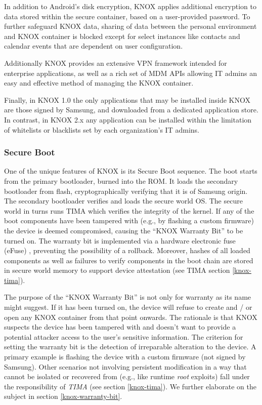 \documentclass[11pt]{article}
\begin{document}
In addition to Android's disk encryption, KNOX applies additional encryption to data stored within the secure container, based on a user-provided password.
To further safeguard KNOX data, sharing of data between the personal environment and KNOX container  
is blocked except for select instances like contacts and calendar events that are dependent on user configuration.

Additionally KNOX provides an extensive VPN framework intended for enterprise applications, as well as a rich set of MDM APIs allowing IT admins
an easy and effective method of managing the KNOX container.

Finally, in KNOX 1.0 the only applications that may be installed inside KNOX are those signed by Samsung, 
and downloaded from a dedicated application store. 
In contrast, in KNOX 2.x any application can be installed within the limitation of whitelists or blacklists set by each organization's IT admins. 

\subsubsection{Secure Boot} \label{knox-secure-boot}
One of the unique features of KNOX is its Secure Boot sequence.
The boot starts from the primary bootloader, burned into the ROM. It loads the secondary bootloader from flash, cryptographically verifying that it is of 
Samsung origin. The secondary bootloader verifies and loads the secure world OS. The secure world in turns runs TIMA which verifies the integrity of the 
kernel. If any of the boot components have been tampered with (e.g., by flashing a custom firmware) the device is deemed compromised, causing the 
``KNOX Warranty Bit'' \cite{KNOXWarrantyBit} to be turned on. The warranty bit is implemented via a hardware electronic fuse (eFuse) \cite{eFuse}, preventing the possibility of a rollback. 
Moreover, hashes of all loaded components as well as failures to verify components in the boot chain are stored in secure world memory to support device attestation (see TIMA section
\ref{knox-tima}).

The purpose of the ``KNOX Warranty Bit'' is not only for warranty as its name might suggest. 
If it has been turned on, the device will refuse to create and / or open any KNOX container from that point onwards. 
The rationale is that KNOX suspects the device has been tampered with and doesn't want to 
provide a potential attacker access to the user's sensitive information. 
The criterion for setting the warranty bit is the detection of irreparable alteration to the device. A primary example is flashing the device with a 
custom firmware (not signed by Samsung). Other scenarios not involving persistent modification in a way that cannot 
be isolated or recovered from (e.g., like runtime \emph{root} exploits) fall under the
responsibility of \emph{TIMA} (see section \ref{knox-tima}). We further elaborate on the subject in section \ref{knox-warranty-bit}.
\end{document}
